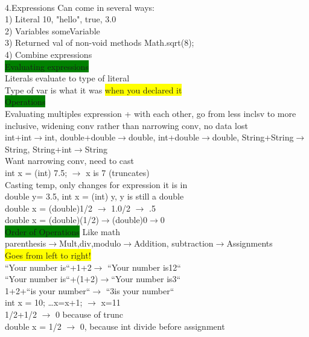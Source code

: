 ~\\ \color{RawSienna}
4.Expressions
Can come in several ways:
\\ 1) Literal 10, "hello", true, 3.0
\\ 2) Variables someVariable
\\ 3) Returned val of non-void methods Math.sqrt(8);
\\ 4) Combine expressions
\\ \colorbox{Green}{Evaluating expressions}
\\ Literals evaluate to type of literal
\\ Type of var is what it was \colorbox{yellow}{when you declared it}
\\ \colorbox{Green}{Operations}
\\ Evaluating multiples expression + with each other, go from less inclsv to more inclusive, widening conv rather than narrowing conv, no data lost
\\ int+int$\rightarrow$int, double+double$\rightarrow$double, int+double$\rightarrow$double, String+String$\rightarrow$String, String+int$\rightarrow$String
\\ Want narrowing conv, need to cast
\\ int x = (int) 7.5; $\rightarrow$ x is 7 (truncates)
\\ Casting temp, only changes for expression it is in
\\ double y= 3.5, int x = (int) y, y is still a double
\\ double x = (double)1/2 $\rightarrow$ 1.0/2 $\rightarrow$ .5
\\ double x = (double)(1/2)$\rightarrow$(double)0$\rightarrow$0 
\\ \colorbox{Green}{Order of Operations} Like math
\\ parenthesis$\rightarrow$Mult,div,modulo$\rightarrow$Addition, subtraction$\rightarrow$Assignments
\\ \colorbox{Yellow}{Goes from left to right!}
\\ ``Your number is``+1+2$\rightarrow$ ``Your number is12``
\\ ``Your number is``+(1+2)$\rightarrow$``Your number is3``
\\ 1+2+``is your number``$\rightarrow$ ``3is your number``
\\int x = 10; \ldots x=x+1; $\rightarrow$ x=11
\\ 1/2+1/2 $\rightarrow$ 0 because of trunc
\\ double x = 1/2 $\rightarrow$ 0, because int divide before assignment

